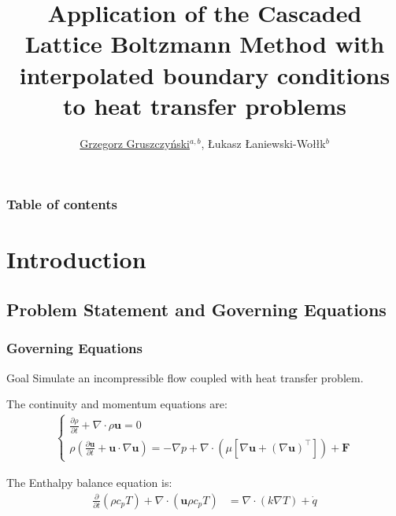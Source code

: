 \documentclass[10pt]{beamer}
\author{\underline{Grzegorz Gruszczyński}$^{a,b}$, Łukasz Łaniewski-Wołłk$^b$}
\title{Application of the Cascaded Lattice Boltzmann Method with 
interpolated boundary conditions to heat transfer problems}
\institute
{
\textbf{$^a$University of Warsaw, Interdisciplinary Centre for Mathematical and Computational Modelling\newline} %
\textbf{$^b$Warsaw University of Technology, Faculty of Power and Aeronautical Engineering}
}
\date{\vspace{5pt}\formatdate{13}{2}{2019}}
\newcommand{\pr}[1]{\frac{\partial}{\partial #1}}
\begin{document}
\maketitle


\begin{frame}\frametitle{Table of contents}
\tableofcontents
\end{frame} 

\section{Introduction} 
\subsection{Problem Statement and Governing Equations} 
\begin{frame}\frametitle{Governing Equations} 
{}
\begin{exampleblock}{Goal}
Simulate an incompressible flow coupled with heat transfer problem. \newline
\end{exampleblock}
  
The continuity and momentum equations are:
\begin{eqnarray}  
\left\{
	\begin{array}{ll}
\frac{\partial \rho}{\partial t} + \nabla \cdot \rho \textbf{u} = 0 \\
\rho\left( \frac{\partial \textbf{u} }{\partial t} + \textbf{u} \cdot \nabla \textbf{u}\right) = -\nabla p + \nabla \cdot (\mu[ \nabla \textbf{u} + (\nabla \textbf{u})^\top]) + \textbf{F}
	\end{array}\nonumber 
\right.
\end{eqnarray}

The Enthalpy balance equation is:
\begin{align}
\pr{t} (\rho c_p T ) + \nabla \cdot (\boldsymbol{u} \rho c_p T ) &= \nabla \cdot (k \nabla T)  + \dot{q} \nonumber %
\end{align}
\end{frame}
\end{document}
